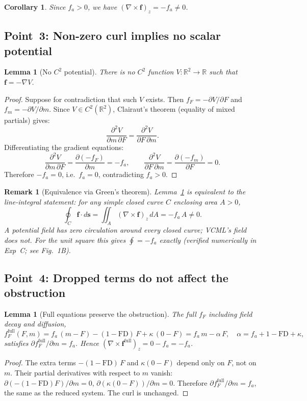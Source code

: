 \documentclass[11pt,a4paper]{article}
\newtheorem{lemma}[theorem]{Lemma}
\newtheorem{corollary}[theorem]{Corollary}
\newtheorem{remark}[theorem]{Remark}
\begin{document}
\begin{corollary}
\label{cor:curl-ne-zero}
Since $f_a > 0$, we have $(\nabla\times\mathbf{f})_z = -f_a \neq 0$.
\end{corollary}

\subsection{Point~3: Non-zero curl implies no scalar potential}

\begin{lemma}[No $C^2$ potential]
\label{lem:no-potential}
There is no $C^2$ function $V:\mathbb{R}^2\to\mathbb{R}$ such that
$\mathbf{f} = -\nabla V$.
\end{lemma}
\begin{proof}
Suppose for contradiction that such $V$ exists.
Then $f_F = -\partial V/\partial F$ and $f_m = -\partial V/\partial m$.
Since $V \in C^2(\mathbb{R}^2)$, Clairaut's theorem (equality of mixed
partials) gives:
\[
  \frac{\partial^2 V}{\partial m\,\partial F}
  = \frac{\partial^2 V}{\partial F\,\partial m}.
\]
Differentiating the gradient equations:
\[
  \frac{\partial^2 V}{\partial m\,\partial F}
  = \frac{\partial(-f_F)}{\partial m}
  = -f_a,
  \qquad
  \frac{\partial^2 V}{\partial F\,\partial m}
  = \frac{\partial(-f_m)}{\partial F}
  = 0.
\]
Therefore $-f_a = 0$, i.e.\ $f_a = 0$, contradicting $f_a > 0$.
\end{proof}

\begin{remark}[Equivalence via Green's theorem]
Lemma~\ref{lem:no-potential} is equivalent to the line-integral statement:
for any simple closed curve $C$ enclosing area $A > 0$,
\[
  \oint_C \mathbf{f}\cdot d\mathbf{s}
  = \iint_A (\nabla\times\mathbf{f})_z\,dA
  = -f_a\,A \neq 0.
\]
A potential field has zero circulation around every closed curve;
VCML's field does not.
For the unit square this gives $\oint = -f_a$ exactly
(verified numerically in Exp~C; see Fig.~1B).
\end{remark}

\subsection{Point~4: Dropped terms do not affect the obstruction}

\begin{lemma}[Full equations preserve the obstruction]
\label{lem:full}
The full $f_F$ including field decay and diffusion,
\[
  f_F^{\mathrm{full}}(F,m)
  = f_a\,(m-F) - (1-\mathrm{FD})\,F + \kappa\,(0-F)
  = f_a\,m - \alpha\,F,
  \quad \alpha = f_a + 1-\mathrm{FD} + \kappa,
\]
satisfies $\partial f_F^{\mathrm{full}}/\partial m = f_a$.
Hence $(\nabla\times\mathbf{f}^{\mathrm{full}})_z = 0 - f_a = -f_a$.
\end{lemma}
\begin{proof}
The extra terms $-(1-\mathrm{FD})\,F$ and $\kappa(0-F)$ depend only on $F$,
not on $m$.
Their partial derivatives with respect to $m$ vanish:
$\partial(-(1-\mathrm{FD})F)/\partial m = 0$,
$\partial(\kappa(0-F))/\partial m = 0$.
Therefore $\partial f_F^{\mathrm{full}}/\partial m = f_a$,
the same as the reduced system.
The curl is unchanged.
\end{proof}
\end{document}
